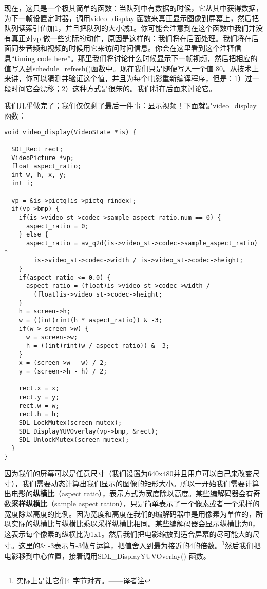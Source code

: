 现在，这只是一个极其简单的函数：当队列中有数据的时候，它从其中获得数据，为下一帧设置定时器，调用video_display 函数来真正显示图像到屏幕上，然后把队列读索引值加1，并且把队列的大小减1。你可能会注意到在这个函数中我们并没有真正对vp 做一些实际的动作，原因是这样的：我们将在后面处理。我们将在后面同步音频和视频的时候用它来访问时间信息。你会在这里看到这个注释信息“timing code here”。那里我们将讨论什么时候显示下一帧视频，然后把相应的值写入到schedule_refresh()函数中。现在我们只是随便写入一个值 80。从技术上来讲，你可以猜测并验证这个值，并且为每个电影重新编译程序，但是：1）过一段时间它会漂移；2）这种方式是很笨的。我们将在后面来讨论它。

我们几乎做完了；我们仅仅剩了最后一件事：显示视频！下面就是video_display函数：
\begin{lstlisting}
void video_display(VideoState *is) {

  SDL_Rect rect;
  VideoPicture *vp;
  float aspect_ratio;
  int w, h, x, y;
  int i;

  vp = &is->pictq[is->pictq_rindex];
  if(vp->bmp) {
    if(is->video_st->codec->sample_aspect_ratio.num == 0) {
      aspect_ratio = 0;
    } else {
      aspect_ratio = av_q2d(is->video_st->codec->sample_aspect_ratio) *
        is->video_st->codec->width / is->video_st->codec->height;
    }
    if(aspect_ratio <= 0.0) {
      aspect_ratio = (float)is->video_st->codec->width /
        (float)is->video_st->codec->height;
    }
    h = screen->h;
    w = ((int)rint(h * aspect_ratio)) & -3;
    if(w > screen->w) {
      w = screen->w;
      h = ((int)rint(w / aspect_ratio)) & -3;
    }
    x = (screen->w - w) / 2;
    y = (screen->h - h) / 2;

    rect.x = x;
    rect.y = y;
    rect.w = w;
    rect.h = h;
	SDL_LockMutex(screen_mutex);
    SDL_DisplayYUVOverlay(vp->bmp, &rect);
	SDL_UnlockMutex(screen_mutex);
  }
}
\end{lstlisting}

因为我们的屏幕可以是任意尺寸（我们设置为640x480并且用户可以自己来改变尺寸），我们需要动态计算出我们显示的图像的矩形大小。所以一开始我们需要计算出电影的\textbf{纵横比}（aspect ratio），表示方式为宽度除以高度。某些编解码器会有奇数\textbf{采样纵横比}（sample aspect ration），只是简单表示了一个像素或者一个采样的宽度除以高度的比例。因为宽度和高度在我们的编解码器中是用像素为单位的，所以实际的纵横比与纵横比乘以采样纵横比相同。某些编解码器会显示纵横比为0，这表示每个像素的纵横比为1x1。然后我们把电影缩放到适合屏幕的尽可能大的尺寸。这里的\& -3表示与-3做与运算，把值舍入到最为接近的4的倍数。\footnote{ 实际上是让它们4 字节对齐。——译者注}然后我们把电影移到中心位置，接着调用SDL_DisplayYUVOverlay() 函数。


